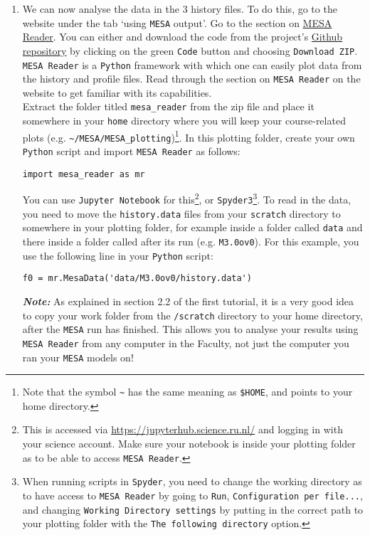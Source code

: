\documentclass[11pt,a4paper]{article}
\begin{document}
\begin{enumerate}
\item We can now analyse the data in the 3 history files. To do this, go to the website under the tab `using \texttt{MESA} output'. Go to the section on \href{https://docs.mesastar.org/en/latest/using_mesa/output.html#plotting-mesa-output}{MESA Reader}. 
%
You can either and download the code from the project's \href{https://github.com/wmwolf/py_mesa_reader}{Github repository} by clicking on the green \texttt{Code} button and choosing \texttt{Download ZIP}. \texttt{MESA Reader} is a \texttt{Python} framework with which one can easily plot data from the history and profile files. Read through the section on \texttt{MESA Reader} on the website to get familiar with its capabilities. \\[1ex]
Extract the folder titled \texttt{mesa\_reader} from the zip file and place it somewhere in your \texttt{home} directory where you will keep your course-related plots (e.g. \verb|~/MESA/MESA_plotting|)\footnote{Note that the symbol \texttt{\~} has the same meaning as \texttt{\$HOME}, and points to your home directory.}. In this plotting folder, create your own \texttt{Python} script and import \texttt{MESA Reader} as follows:
\begin{verbatim}
import mesa_reader as mr
\end{verbatim}
You can use \texttt{Jupyter Notebook} for this\footnote{This is accessed via \url{https://jupyterhub.science.ru.nl/} and logging in with your science account. Make sure your notebook is inside your plotting folder as to be able to access \texttt{MESA Reader}.}, or \texttt{Spyder3}\footnote{When running scripts in \texttt{Spyder}, you need to change the working directory as to have access to \texttt{MESA Reader} by going to \texttt{Run}, \texttt{Configuration per file...}, and changing \texttt{Working Directory settings} by putting in the correct path to your plotting folder with the \texttt{The following directory} option.}. To read in the data, you need to move the \texttt{history.data} files from your \texttt{scratch} directory to somewhere in your plotting folder, for example inside a folder called \texttt{data} and there inside a folder called after its run (e.g. \texttt{M3.0ov0}). For this example, you use the following line in your \texttt{Python} script:
\begin{verbatim}
f0 = mr.MesaData('data/M3.0ov0/history.data')
\end{verbatim}
\emph{\textbf{Note:}} As explained in section 2.2 of the first tutorial, it is a very good idea to copy your work folder from the \verb|/scratch| directory to your home directory, after the \texttt{MESA} run has finished. This allows you to analyse your results using \texttt{MESA Reader} from any computer in the Faculty, not just the computer you ran your \texttt{MESA} models on! \\[1ex]

\end{enumerate}
\end{document}
